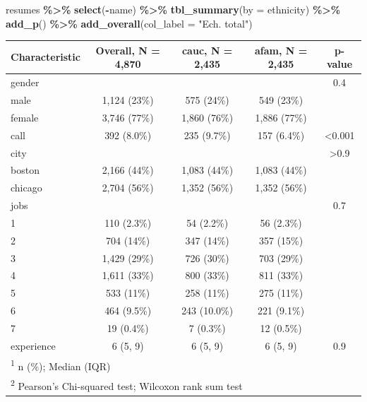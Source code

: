 \documentclass[
  11pt,
]{book}
\newenvironment{Shaded}{\begin{snugshade}}{\end{snugshade}}
\newcommand{\AttributeTok}[1]{\textcolor[rgb]{0.13,0.29,0.53}{#1}}
\newcommand{\FunctionTok}[1]{\textcolor[rgb]{0.13,0.29,0.53}{\textbf{#1}}}
\newcommand{\NormalTok}[1]{#1}
\newcommand{\SpecialCharTok}[1]{\textcolor[rgb]{0.81,0.36,0.00}{\textbf{#1}}}
\newcommand{\StringTok}[1]{\textcolor[rgb]{0.31,0.60,0.02}{#1}}
\numberwithin{equation}{section}
\numberwithin{countremarque}{section}
\begin{document}
\begin{Shaded}
\begin{Highlighting}[]
\NormalTok{resumes }\SpecialCharTok{\%\textgreater{}\%}
  \FunctionTok{select}\NormalTok{(}\SpecialCharTok{{-}}\NormalTok{name) }\SpecialCharTok{\%\textgreater{}\%} 
  \FunctionTok{tbl\_summary}\NormalTok{(}\AttributeTok{by =}\NormalTok{ ethnicity) }\SpecialCharTok{\%\textgreater{}\%} 
  \FunctionTok{add\_p}\NormalTok{() }\SpecialCharTok{\%\textgreater{}\%} 
  \FunctionTok{add\_overall}\NormalTok{(}\AttributeTok{col\_label =} \StringTok{"Ech. total"}\NormalTok{)}
\end{Highlighting}
\end{Shaded}

\begin{longtable}{lcccc}
\toprule
\textbf{Characteristic} & \textbf{Overall}, N = 4,870 & \textbf{cauc}, N = 2,435 & \textbf{afam}, N = 2,435 & \textbf{p-value}\\
\midrule
gender &  &  &  & 0.4\\
\hspace{1em}male & 1,124 (23\%) & 575 (24\%) & 549 (23\%) & \\
\hspace{1em}female & 3,746 (77\%) & 1,860 (76\%) & 1,886 (77\%) & \\
call & 392 (8.0\%) & 235 (9.7\%) & 157 (6.4\%) & <0.001\\
city &  &  &  & >0.9\\
\addlinespace
\hspace{1em}boston & 2,166 (44\%) & 1,083 (44\%) & 1,083 (44\%) & \\
\hspace{1em}chicago & 2,704 (56\%) & 1,352 (56\%) & 1,352 (56\%) & \\
jobs &  &  &  & 0.7\\
\hspace{1em}1 & 110 (2.3\%) & 54 (2.2\%) & 56 (2.3\%) & \\
\hspace{1em}2 & 704 (14\%) & 347 (14\%) & 357 (15\%) & \\
\addlinespace
\hspace{1em}3 & 1,429 (29\%) & 726 (30\%) & 703 (29\%) & \\
\hspace{1em}4 & 1,611 (33\%) & 800 (33\%) & 811 (33\%) & \\
\hspace{1em}5 & 533 (11\%) & 258 (11\%) & 275 (11\%) & \\
\hspace{1em}6 & 464 (9.5\%) & 243 (10.0\%) & 221 (9.1\%) & \\
\hspace{1em}7 & 19 (0.4\%) & 7 (0.3\%) & 12 (0.5\%) & \\
\addlinespace
experience & 6 (5, 9) & 6 (5, 9) & 6 (5, 9) & 0.9\\
\bottomrule
\multicolumn{5}{l}{\rule{0pt}{1em}\textsuperscript{1} n (\%); Median (IQR)}\\
\multicolumn{5}{l}{\rule{0pt}{1em}\textsuperscript{2} Pearson's Chi-squared test; Wilcoxon rank sum test}\\
\end{longtable}
\end{document}
